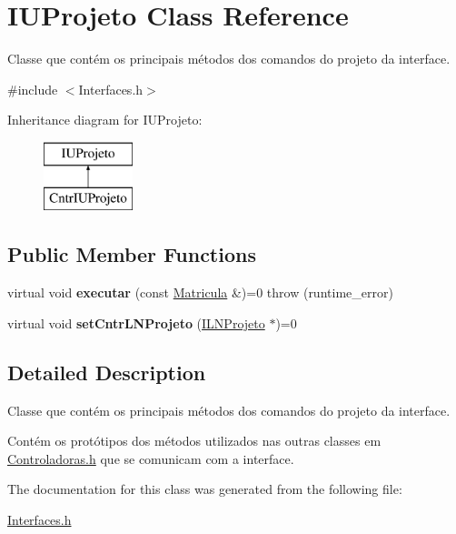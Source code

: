 \hypertarget{class_i_u_projeto}{}\section{I\+U\+Projeto Class Reference}
\label{class_i_u_projeto}


Classe que contém os principais métodos dos comandos do projeto da interface.  




{\ttfamily \#include $<$Interfaces.\+h$>$}

Inheritance diagram for I\+U\+Projeto\+:\begin{figure}[H]
\begin{center}
\leavevmode
\includegraphics[height=2.000000cm]{class_i_u_projeto}
\end{center}
\end{figure}
\subsection*{Public Member Functions}
\begin{DoxyCompactItemize}
\item 
\hypertarget{class_i_u_projeto_ae5e911cacd0c88f2306df132c70027a5}{}\label{class_i_u_projeto_ae5e911cacd0c88f2306df132c70027a5} 
virtual void {\bfseries executar} (const \hyperlink{class_matricula}{Matricula} \&)=0  throw (runtime\+\_\+error)
\item 
\hypertarget{class_i_u_projeto_ac5a532baf383314cb2e4836aa69a7447}{}\label{class_i_u_projeto_ac5a532baf383314cb2e4836aa69a7447} 
virtual void {\bfseries set\+Cntr\+L\+N\+Projeto} (\hyperlink{class_i_l_n_projeto}{I\+L\+N\+Projeto} $\ast$)=0
\end{DoxyCompactItemize}


\subsection{Detailed Description}
Classe que contém os principais métodos dos comandos do projeto da interface. 

Contém os protótipos dos métodos utilizados nas outras classes em \hyperlink{_controladoras_8h}{Controladoras.\+h} que se comunicam com a interface. 

The documentation for this class was generated from the following file\+:\begin{DoxyCompactItemize}
\item 
\hyperlink{_interfaces_8h}{Interfaces.\+h}\end{DoxyCompactItemize}
